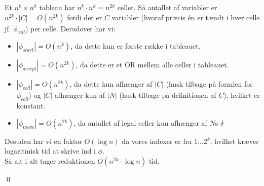 Et $n^k \times n^k$ tableau har $n^k \cdot n^k = n^{2k}$ celler. Så antallet af variabler er $n^{2k} \cdot |C|=O(n^{2k})$ fordi der er $C$ variabler (hvoraf præcis én er tændt i hver celle jf. $\phi_{cell}$) per celle. Derudover har vi:
\begin{itemize}
	\item $|\phi_{start}|=O(n^k)$, da dette kun er første række i tableauet.
	\item $|\phi_{accept}|=O(n^{2k})$, da dette er et OR mellem alle celler i tableauet. 
	\item $|\phi_{cell}|=O(n^{2k})$, da dette kun afhænger af $|C|$ (husk tilbage på formlen for $\phi_{cell}$) og $|C|$ afhænger kun af $|N|$ (husk tilbage på definitionen af $C$), hvilket er konstant.
	\item $|\phi_{move}|=O(n^{2k})$, da antallet af legal celler kun afhænger af $N$s $\delta$
\end{itemize}  
Desuden har vi en faktor $O(\log n)$ da vores indexer er fra $1\ldots2^k$, hvilket kræver logaritmisk tid at skrive ind i $\phi$. \\

Så alt i alt tager reduktionen $O(n^{2k} \cdot \log n)$ tid.
\begin{flushright}
	\qed
\end{flushright}



